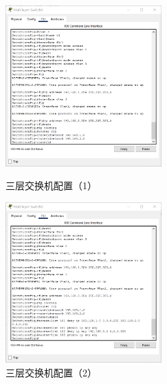 \documentclass{imutthesis}
\begin{document}
\begin{figure}[h]
    \centering
    \begin{minipage}[t]{0.48\textwidth}
        \centering
        \includegraphics[width=6cm]{三层交换机1.png}
        \caption{三层交换机配置（1）}
    \end{minipage}
    \begin{minipage}[t]{0.48\textwidth}
        \centering
        \includegraphics[width=6cm]{三层交换机2.png}
        \caption{三层交换机配置（2）}
    \end{minipage}
\end{figure}

\newpage
\end{document}

